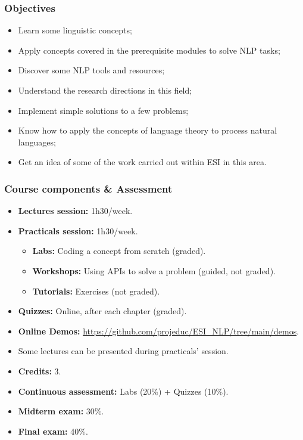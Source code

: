 \documentclass{beamer}
\begin{document}
\begin{frame}
\frametitle{Objectives}

\begin{itemize}
	\item Learn some linguistic concepts;
	\item Apply concepts covered in the prerequisite modules to solve NLP tasks;
	\item Discover some NLP tools and resources;
	\item Understand the research directions in this field;
	\item Implement simple solutions to a few problems;
	\item Know how to apply the concepts of language theory to process natural languages;
	\item Get an idea of some of the work carried out within ESI in this area.
\end{itemize}

\end{frame}


\begin{frame}
\frametitle{Course components \& Assessment}

\begin{itemize}
	\item \textbf{Lectures session:} 1h30/week.
	\item \textbf{Practicals session:} 1h30/week.
	\begin{itemize}
		\item \textbf{Labs:} Coding a concept from scratch (graded).
		\item \textbf{Workshops:} Using APIs to solve a problem (guided, not graded).
		\item \textbf{Tutorials:} Exercises (not graded).
	\end{itemize}
	\item \textbf{Quizzes:} Online, after each chapter (graded).
	\item \textbf{Online Demos:} {\scriptsize\url{https://github.com/projeduc/ESI_NLP/tree/main/demos}}.
	\item Some lectures can be presented during practicals' session.
\end{itemize}

\vfill

\begin{itemize}
	\item \textbf{Credits:} 3.
	\item \textbf{Continuous assessment:} Labs (20\%) + Quizzes (10\%).
	\item \textbf{Midterm exam:} 30\%.
	\item \textbf{Final exam:} 40\%.
\end{itemize}

\end{frame}
\end{document}
